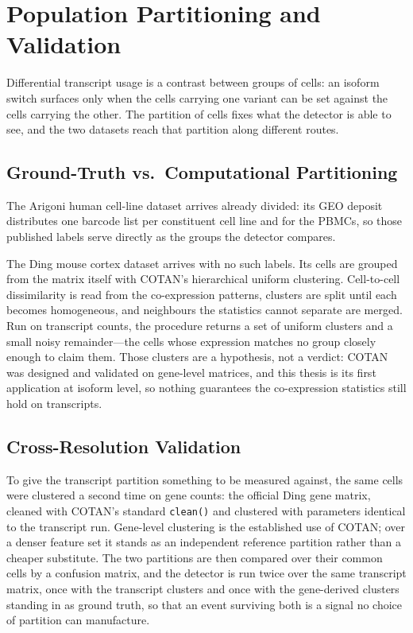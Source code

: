 \section{Population Partitioning and Validation}

Differential transcript usage is a contrast between groups of cells: an isoform switch surfaces only when the cells carrying one variant can be set against the cells carrying the other. The partition of cells fixes what the detector is able to see, and the two datasets reach that partition along different routes.

\subsection*{Ground-Truth vs.\ Computational Partitioning}

The Arigoni human cell-line dataset arrives already divided: its GEO deposit distributes one barcode list per constituent cell line and for the PBMCs, so those published labels serve directly as the groups the detector compares.

The Ding mouse cortex dataset arrives with no such labels. Its cells are grouped from the matrix itself with COTAN's hierarchical uniform clustering. Cell-to-cell dissimilarity is read from the co-expression patterns, clusters are split until each becomes homogeneous, and neighbours the statistics cannot separate are merged. Run on transcript counts, the procedure returns a set of uniform clusters and a small noisy remainder---the cells whose expression matches no group closely enough to claim them. Those clusters are a hypothesis, not a verdict: COTAN was designed and validated on gene-level matrices, and this thesis is its first application at isoform level, so nothing guarantees the co-expression statistics still hold on transcripts.

\subsection*{Cross-Resolution Validation}

To give the transcript partition something to be measured against, the same cells were clustered a second time on gene counts: the official Ding gene matrix, cleaned with COTAN's standard \texttt{clean()} and clustered with parameters identical to the transcript run. Gene-level clustering is the established use of COTAN; over a denser feature set it stands as an independent reference partition rather than a cheaper substitute. The two partitions are then compared over their common cells by a confusion matrix, and the detector is run twice over the same transcript matrix, once with the transcript clusters and once with the gene-derived clusters standing in as ground truth, so that an event surviving both is a signal no choice of partition can manufacture. 
